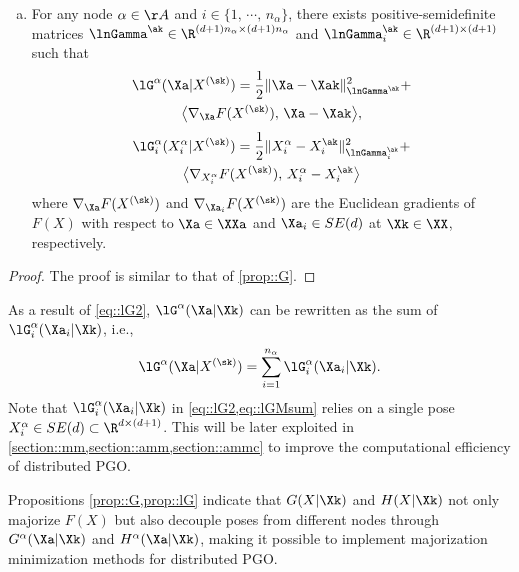 \begin{prop}
{\begin{enumerate}[(a)]
	\item\label{prop::lG3} For any node $\alpha\in\AA$ and $i\!\in\!\{1,\,\cdots,\, n_\alpha\}$, there exists positive-semidefinite matrices $\lnGamma^{\ak}\in \R^{(d+1)n_\alpha\times (d+1)n_\alpha}$ and $\lnGamma_i^{\ak}\in \R^{(d+1)\times (d+1)}$ such that
	\vspace{-0.25em}
	\begin{multline}\label{eq::lGMa}
		\lG^\alpha(\Xa|X^{(\sk)}) =\frac{1}{2}\|\Xa-\Xak\|_{\lnGamma^{\ak}}^2+\\
		\big\langle\nabla_{\Xa} F(X^{(\sk)}),\,{\Xa-\Xak}\big\rangle,
	\end{multline}
	\vspace{-1.25em}
	\begin{multline}\label{eq::lGMai}
		\lG_i^\alpha(X_i^\alpha|X^{(\sk)}) =\frac{1}{2}\|X_i^\alpha-X_i^{\ak}\|_{\lnGamma_i^{\ak}}^2+\\
		\big\langle\nabla_{X_i^{\alpha}} F(X^{(\sk)}),\,{X_i^{\alpha}-X_i^{\ak}}\big\rangle
	\end{multline}
	 where $\nabla_{\Xa} F(X^{(\sk)})$ and $\nabla_{\Xa_i} F(X^{(\sk)})$ are the Euclidean gradients of $F(X)$ with respect to $\Xa\in\XXa$ and $\Xa_i\in SE(d)$ at $\Xk\in\XX$, respectively. 
\end{enumerate}
}
\end{prop}
\begin{proof}
The proof is similar to that of \cref{prop::G}.
\end{proof}

\begin{remark}
As a result of \cref{eq::lG2}, $\lG^\alpha(\Xa|\Xk)$ can be rewritten as the sum of $\lG_i^\alpha(\Xa_i|\Xk)$, i.e.,
\begin{equation}\label{eq::lGMsum}
	\lG^\alpha(\Xa|X^{(\sk)})=\sum_{i=1}^{n_\alpha} \lG_i^{\alpha}(\Xa_i|\Xk).
\end{equation}
Note that $\lG_i^\alpha(\Xa_i|\Xk)$ in \cref{eq::lG2,eq::lGMsum} relies on a single pose $X_i^\alpha\in SE(d)\subset \R^{d\times (d+1)}$. This will be later exploited  in \cref{section::mm,section::amm,section::ammc} to improve the computational efficiency of distributed PGO.
\end{remark}

\begin{remark}
Propositions \cref{prop::G,prop::lG}  indicate that $G(X|\Xk)$ and $H(X|\Xk)$ not only majorize $F(X)$ but also decouple  poses from different nodes through  $G^\alpha(\Xa|\Xk)$ and $H^\alpha(\Xa|\Xk)$, making it possible to implement majorization minimization methods for distributed PGO.
\end{remark}

